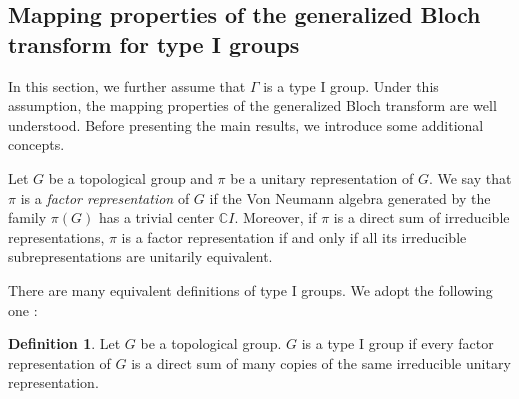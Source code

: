 \documentclass[11pt,oneside,reqno]{amsart}
\theoremstyle{definition}
\newtheorem{definition}{Definition}[section]
\newtheorem{remark}[definition]{Remark}
\numberwithin{equation}{section}
\theoremstyle{plain}
\begin{document}



\subsection{Mapping properties of the generalized Bloch transform for type I groups} \label{sec:mapBlochtypeI}

In this section, we further assume that $\Gamma$ is a type I group. Under this assumption, the mapping properties of the generalized Bloch transform are well understood. Before presenting the main results, we introduce some additional concepts.

Let $G$ be a topological group and $\pi$ be a unitary representation of $G$. We say that $\pi$ is a \emph{factor representation} of $G$ if the Von Neumann algebra generated by the family $\pi(G)$ has a trivial center $\mathbb{C}I$. Moreover, if $\pi$ is a direct sum of irreducible representations, $\pi$ is a factor representation if and only if all its irreducible subrepresentations are unitarily equivalent.

There are many equivalent definitions of type I groups. We adopt the following one \cite[Page 229]{folland2016course}:

\begin{definition}\label{defoftype1}
    Let $G$ be a topological group. $G$ is a type I group if every factor representation of $G$ is a direct sum of many copies of the same irreducible unitary representation.
\end{definition}
\end{document}
